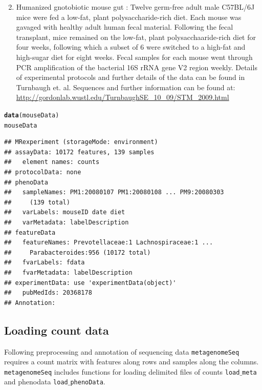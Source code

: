 \documentclass[a4paper,11pt]{article}\usepackage[]{graphicx}\usepackage[]{color}
\makeatletter
\newcommand{\hlstd}[1]{\textcolor[rgb]{0.345,0.345,0.345}{#1}}%
\newcommand{\hlkwd}[1]{\textcolor[rgb]{0.737,0.353,0.396}{\textbf{#1}}}%
\newenvironment{kframe}{%
 \def\at@end@of@kframe{}%
 \ifinner\ifhmode%
  \def\at@end@of@kframe{\end{minipage}}%
  \begin{minipage}{\columnwidth}%
 \fi\fi%
 \def\FrameCommand##1{\hskip\@totalleftmargin \hskip-\fboxsep
 \colorbox{shadecolor}{##1}\hskip-\fboxsep
     \hskip-\linewidth \hskip-\@totalleftmargin \hskip\columnwidth}%
 \MakeFramed {\advance\hsize-\width
   \@totalleftmargin\z@ \linewidth\hsize
   \@setminipage}}%
 {\par\unskip\endMakeFramed%
 \at@end@of@kframe}
\newenvironment{knitrout}{}{} %
\makeatother
\begin{document}
\begin{enumerate}
\setcounter{enumi}{1}
\item Humanized gnotobiotic mouse gut \cite{ts_mouse}:
Twelve germ-free adult male C57BL/6J mice were fed a low-fat, plant polysaccharide-rich diet. Each mouse was gavaged with healthy adult human fecal material. Following the fecal transplant, mice remained on the low-fat, plant polysacchaaride-rich diet for four weeks, following which a subset of 6 were switched to a high-fat and high-sugar diet for eight weeks. Fecal samples for each mouse went through PCR amplification of the bacterial 16S rRNA gene V2 region weekly. Details of experimental protocols and further details of the data can be found in Turnbaugh et. al. Sequences and further information can be found at:
\url{http://gordonlab.wustl.edu/TurnbaughSE_10_09/STM_2009.html}

\end{enumerate}
\begin{knitrout}
\color{fgcolor}\begin{kframe}
\begin{alltt}
\hlkwd{data}\hlstd{(mouseData)}
\hlstd{mouseData}
\end{alltt}
\begin{verbatim}
## MRexperiment (storageMode: environment)
## assayData: 10172 features, 139 samples 
##   element names: counts 
## protocolData: none
## phenoData
##   sampleNames: PM1:20080107 PM1:20080108 ... PM9:20080303
##     (139 total)
##   varLabels: mouseID date diet
##   varMetadata: labelDescription
## featureData
##   featureNames: Prevotellaceae:1 Lachnospiraceae:1 ...
##     Parabacteroides:956 (10172 total)
##   fvarLabels: fdata
##   fvarMetadata: labelDescription
## experimentData: use 'experimentData(object)'
##   pubMedIds: 20368178 
## Annotation:
\end{verbatim}
\end{kframe}
\end{knitrout}


\subsection{Loading count data}
Following preprocessing and annotation of sequencing data \texttt{metagenomeSeq} requires a count matrix with features along rows and samples along the columns.
\texttt{metagenomeSeq} includes functions for loading delimited files of counts 
\texttt{load$\_$meta} and phenodata \texttt{load$\_$phenoData}.
\end{document}
